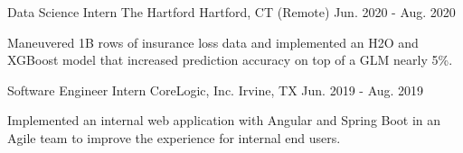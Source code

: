 \begin{cventries}

\cventry
{Data Science Intern} %
{The Hartford} %
{Hartford, CT (Remote)} %
{Jun. 2020 - Aug. 2020} %
{ %
\begin{cvitems}
\item {Maneuvered 1B rows of insurance loss data and implemented an H2O and XGBoost model that increased prediction accuracy on top of a GLM nearly 5\%.}
\end{cvitems} 
}


\cventry
{Software Engineer Intern} %
{CoreLogic, Inc.} %
{Irvine, TX} %
{Jun. 2019 - Aug. 2019} %
{ %
\begin{cvitems}
\item {Implemented an internal web application with Angular and Spring Boot in an Agile team to improve the experience for internal end users.}
\end{cvitems}
}


\end{cventries}
